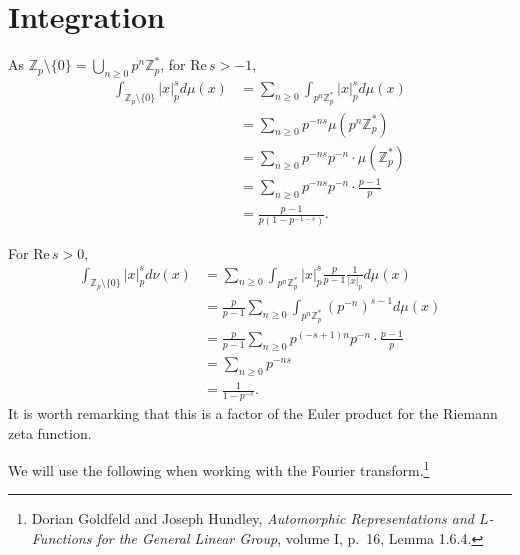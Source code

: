 \documentclass{article}
\def\Re{\ensuremath{\mathrm{Re}}\,}
\theoremstyle{definition}
\begin{document}
\section{Integration}
As $\mathbb{Z}_p \setminus \{0\} = \bigcup_{n \geq 0} p^n \mathbb{Z}_p^*$, 
for $\Re s>-1$,
\begin{align*}
\int_{\mathbb{Z}_p \setminus \{0\}} |x|_p^s d\mu(x)&=\sum_{n \geq 0} \int_{p^n \mathbb{Z}_p^*}
|x|_p^s d\mu(x)\\
&=\sum_{n \geq 0} p^{-ns} \mu(p^n \mathbb{Z}_p^*) \\
&=\sum_{n \geq 0} p^{-ns} p^{-n} \cdot \mu(\mathbb{Z}_p^*)\\
&=\sum_{n \geq 0} p^{-ns} p^{-n} \cdot \frac{p-1}{p}\\
&=\frac{p-1}{p(1-p^{-1-s})}.
\end{align*}

For $\Re s>0$,
\begin{align*}
\int_{\mathbb{Z}_p \setminus \{0\}} |x|_p^s d\nu(x)&=\sum_{n \geq 0} \int_{p^n \mathbb{Z}_p^*}
|x|_p^s \frac{p}{p-1} \frac{1}{|x|_p} d\mu(x)\\
&=\frac{p}{p-1} \sum_{n \geq 0} \int_{p^n \mathbb{Z}_p^*} (p^{-n})^{s-1} d\mu(x)\\
&=\frac{p}{p-1} \sum_{n \geq 0} p^{(-s+1)n}  p^{-n} \cdot \frac{p-1}{p}\\
&=\sum_{n \geq 0} p^{-ns}\\
&=\frac{1}{1-p^{-s}}.
\end{align*}
It is worth remarking that this is a factor of the Euler product for the Riemann zeta function. 


We will use the following when working with the Fourier transform.\footnote{Dorian Goldfeld and Joseph Hundley, {\em Automorphic Representations and $L$-Functions for the General Linear Group}, volume
 I, p.~16, Lemma 1.6.4.}
\end{document}
